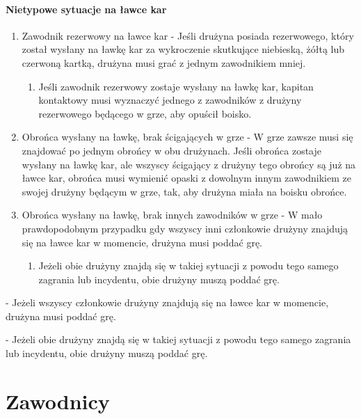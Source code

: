\documentclass[12pt]{article}
\newcommand\other{\bgroup\color{green}\markoverwith{\textcolor{green}{\rule[-0.5ex]{2pt}{0.4pt}}}\ULon}
\begin{document}
\paragraph{Nietypowe sytuacje na ławce kar}

\begin{enumerate}
	\item
	      Zawodnik rezerwowy na ławce kar - Jeśli drużyna posiada rezerwowego,
	      który został wysłany na ławkę kar za wykroczenie skutkujące niebieską,
	      żółtą lub czerwoną kartką, drużyna musi grać z jednym zawodnikiem
	      mniej.

	      \begin{enumerate}
		      \item
		            Jeśli zawodnik rezerwowy zostaje wysłany na ławkę kar, kapitan
		            kontaktowy musi wyznaczyć jednego z zawodników z drużyny rezerwowego
		            będącego w grze, aby opuścił boisko.
	      \end{enumerate}
	\item
	      Obrońca wysłany na ławkę, brak ścigających w grze - W grze zawsze musi
	      się znajdować po jednym obrońcy w obu drużynach. Jeśli obrońca zostaje
	      wysłany na ławkę kar, ale wszyscy ścigający z drużyny tego obrońcy są
	      już na ławce kar, obrońca musi wymienić opaski z dowolnym innym
	      zawodnikiem ze swojej drużyny będącym w grze, tak, aby drużyna miała
	      na boisku obrońce.
	\item
	      Obrońca wysłany na ławkę, brak innych zawodników w grze - W mało
	      prawdopodobnym przypadku gdy wszyscy inni członkowie drużyny znajdują
	      się na ławce kar w momencie, drużyna musi poddać grę.

	      \begin{enumerate}
		      \item
		            Jeżeli obie drużyny znajdą się w takiej sytuacji z powodu tego
		            samego zagrania lub incydentu, obie drużyny muszą poddać grę.
	      \end{enumerate}
\end{enumerate}

\other{Poddanie meczu} - Jeżeli wszyscy członkowie drużyny znajdują się
na ławce kar w momencie, drużyna musi poddać grę.

\other{Poddanie meczu} - Jeżeli obie drużyny znajdą się w takiej sytuacji
z powodu tego samego zagrania lub incydentu, obie drużyny muszą poddać
grę.


\pagebreak
\section{Zawodnicy}
\end{document}
